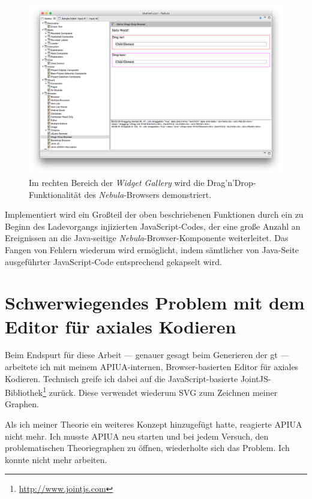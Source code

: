 \begin{figure}
  \centering
    \includegraphics[width=1.0\linewidth]{Figures/browser/BrowserDND.png}
  \caption[Nebula-Browser: Drag'n'Drop]{Im rechten Bereich der \textit{Widget Gallery} wird die Drag'n'Drop-Funktionalität des \textit{Nebula}-Browsers demonstriert.}  \label{fig:BrowserDND}
\end{figure}

Implementiert wird ein Großteil der oben beschriebenen Funktionen durch ein zu Beginn des Ladevorgangs injizierten JavaScript-Codes, der eine große Anzahl an Ereignissen an die Java-seitige \textit{Nebula}-Browser-Komponente weiterleitet.
Das Fangen von Fehlern wiederum wird ermöglicht, indem sämtlicher von Java-Seite ausgeführter JavaScript-Code entsprechend gekapselt wird.




\section*{Schwerwiegendes Problem mit dem Editor für axiales Kodieren}
\label{app:acm-editor-problem}

Beim Endspurt für diese Arbeit --- genauer gesagt beim Generieren der \gls{gt} --- arbeitete ich mit meinem APIUA-internen, Browser-basierten Editor für axiales Kodieren. Technisch greife ich dabei auf die JavaScript-basierte JointJS-Bibliothek\footnote{\url{http://www.jointjs.com}} zurück. Diese verwendet wiederum SVG zum Zeichnen meiner Graphen.

Als ich meiner Theorie ein weiteres Konzept hinzugefügt hatte, reagierte APIUA nicht mehr. Ich musste APIUA neu starten und bei jedem Versuch, den problematischen Theoriegraphen zu öffnen, wiederholte sich das Problem. Ich konnte nicht mehr arbeiten.

